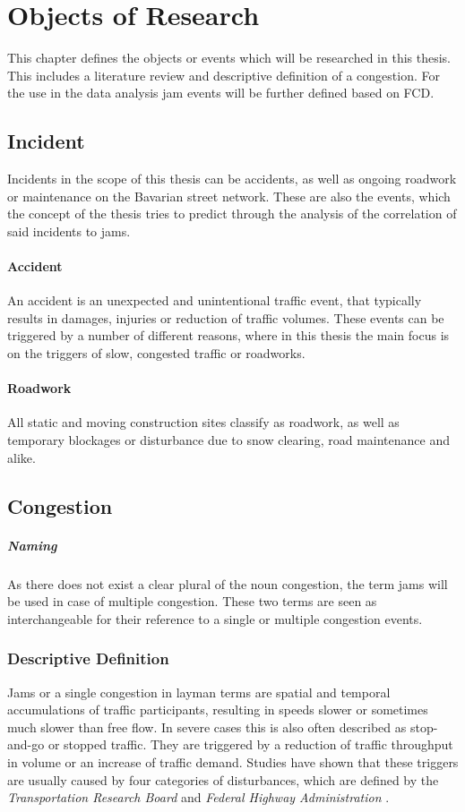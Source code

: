 \chapter{Objects of Research}
	This chapter defines the objects or events which will be researched in this thesis. This includes a literature review and descriptive definition of a congestion. For the use in the data analysis jam events will be further defined based on FCD.  

\section{Incident}
		Incidents in the scope of this thesis can be accidents, as well as ongoing roadwork or maintenance on the Bavarian street network. These are also the events, which the concept of the thesis tries to predict through the analysis of the correlation of said incidents to jams.
	\subsubsection{Accident}
		An accident is an unexpected and unintentional traffic event, that typically results in damages, injuries or reduction of traffic volumes. These events can be triggered by a number of different reasons, where in this thesis the main focus is on the triggers of slow, congested traffic or roadworks.
	\subsubsection{Roadwork}
		All static and moving construction sites classify as roadwork, as well as temporary blockages or disturbance due to snow clearing, road maintenance and alike. 
	
\section{Congestion}
\label{definition_congestion}

\paragraph{Naming} As there does not exist a clear plural of the noun congestion, the term jams will be used in case of multiple congestion. These two terms are seen as interchangeable for their reference to a single or multiple congestion events.

\subsection{Descriptive Definition}
Jams or a single congestion in layman terms are spatial and temporal accumulations of traffic participants, resulting in speeds slower or sometimes much slower than free flow. In severe cases this is also often described as stop-and-go or stopped traffic. They are triggered by a reduction of traffic throughput in volume or an increase of traffic demand. Studies have shown that these triggers are usually caused by four categories of disturbances, which are defined by the \textit{Transportation Research Board} \parencite{TRB2003} and \textit{Federal Highway Administration} \parencite{FHA2011}.

